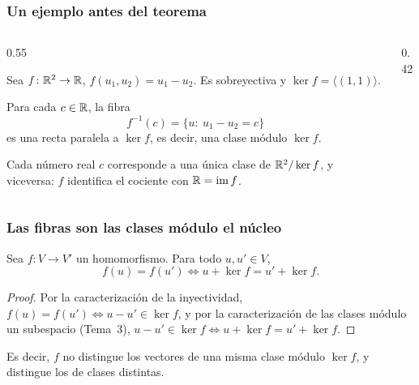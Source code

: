 \begin{frame}
    \frametitle{Un ejemplo antes del teorema}

    \begin{columns}[c]
        \begin{column}{0.55\textwidth}
            \begin{example}
                Sea $f\colon\mathbb{R}^2\to\mathbb{R}$, $f(u_1,u_2)=u_1-u_2$. Es sobreyectiva
                y $\ker f=\langle(1,1)\rangle$.
            \end{example}

            Para cada $c\in\mathbb{R}$, la \alert{fibra}
            \[
                f^{-1}(c)=\{u:\ u_1-u_2=c\}
            \]
            es una recta paralela a $\ker f$, es decir, una clase módulo
            $\ker f$.

            \medskip

            Cada número real $c$ corresponde a una única clase de
            $\mathbb{R}^2/\ker f$, y viceversa: $f$ identifica el cociente con
            $\mathbb{R}=\operatorname{im} f$.
        \end{column}
        \begin{column}{0.42\textwidth}
            \centering
        \end{column}
    \end{columns}
\end{frame}


\begin{frame}
    \frametitle{Las fibras son las clases módulo el núcleo}

    \begin{lemma}
        Sea $f\colon V\to V'$ un homomorfismo. Para todo $u,u'\in V$,
        \[
            f(u)=f(u')\iff u+\ker f=u'+\ker f.
        \]
    \end{lemma}

    \begin{proof}
        Por la caracterización de la inyectividad,
        $f(u)=f(u')\iff u-u'\in\ker f$, y por la caracterización de las
        clases módulo un subespacio (Tema~3),
        $u-u'\in\ker f\iff u+\ker f=u'+\ker f$.
    \end{proof}

    \medskip

    Es decir, $f$ \alert{no distingue} los vectores de una misma clase
    módulo $\ker f$, y distingue los de clases distintas.
\end{frame}



